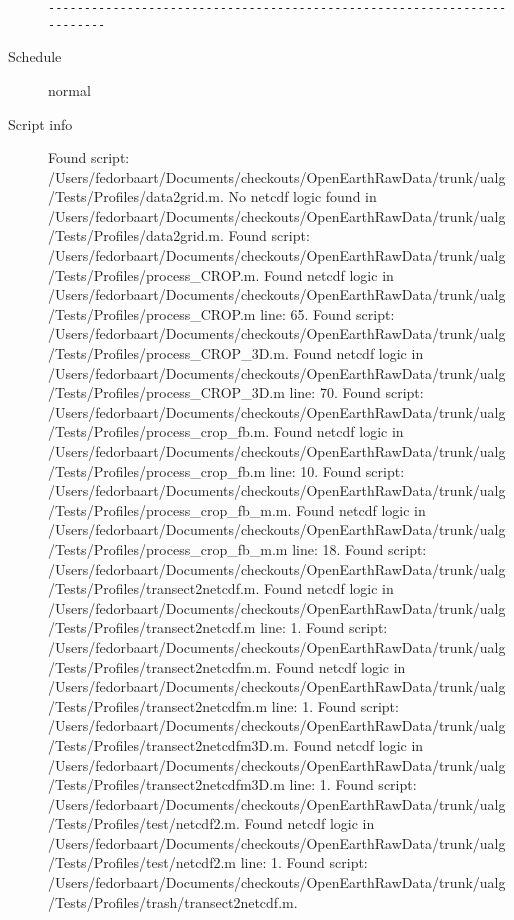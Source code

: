 \documentclass[9]{report}
\begin{document}
\begin{description}
\begin{verbatim}
------------------------------------------------------------------------

\end{verbatim}
  \item[Schedule] normal
  \item[Script info] Found script: /Users/fedorbaart/Documents/checkouts/OpenEarthRawData/trunk/ualg/Tests/Profiles/data2grid.m.
No netcdf logic found in /Users/fedorbaart/Documents/checkouts/OpenEarthRawData/trunk/ualg/Tests/Profiles/data2grid.m.
Found script: /Users/fedorbaart/Documents/checkouts/OpenEarthRawData/trunk/ualg/Tests/Profiles/process\_CROP.m.
Found netcdf logic in /Users/fedorbaart/Documents/checkouts/OpenEarthRawData/trunk/ualg/Tests/Profiles/process\_CROP.m line: 65.
Found script: /Users/fedorbaart/Documents/checkouts/OpenEarthRawData/trunk/ualg/Tests/Profiles/process\_CROP\_3D.m.
Found netcdf logic in /Users/fedorbaart/Documents/checkouts/OpenEarthRawData/trunk/ualg/Tests/Profiles/process\_CROP\_3D.m line: 70.
Found script: /Users/fedorbaart/Documents/checkouts/OpenEarthRawData/trunk/ualg/Tests/Profiles/process\_crop\_fb.m.
Found netcdf logic in /Users/fedorbaart/Documents/checkouts/OpenEarthRawData/trunk/ualg/Tests/Profiles/process\_crop\_fb.m line: 10.
Found script: /Users/fedorbaart/Documents/checkouts/OpenEarthRawData/trunk/ualg/Tests/Profiles/process\_crop\_fb\_m.m.
Found netcdf logic in /Users/fedorbaart/Documents/checkouts/OpenEarthRawData/trunk/ualg/Tests/Profiles/process\_crop\_fb\_m.m line: 18.
Found script: /Users/fedorbaart/Documents/checkouts/OpenEarthRawData/trunk/ualg/Tests/Profiles/transect2netcdf.m.
Found netcdf logic in /Users/fedorbaart/Documents/checkouts/OpenEarthRawData/trunk/ualg/Tests/Profiles/transect2netcdf.m line: 1.
Found script: /Users/fedorbaart/Documents/checkouts/OpenEarthRawData/trunk/ualg/Tests/Profiles/transect2netcdfm.m.
Found netcdf logic in /Users/fedorbaart/Documents/checkouts/OpenEarthRawData/trunk/ualg/Tests/Profiles/transect2netcdfm.m line: 1.
Found script: /Users/fedorbaart/Documents/checkouts/OpenEarthRawData/trunk/ualg/Tests/Profiles/transect2netcdfm3D.m.
Found netcdf logic in /Users/fedorbaart/Documents/checkouts/OpenEarthRawData/trunk/ualg/Tests/Profiles/transect2netcdfm3D.m line: 1.
Found script: /Users/fedorbaart/Documents/checkouts/OpenEarthRawData/trunk/ualg/Tests/Profiles/test/netcdf2.m.
Found netcdf logic in /Users/fedorbaart/Documents/checkouts/OpenEarthRawData/trunk/ualg/Tests/Profiles/test/netcdf2.m line: 1.
Found script: /Users/fedorbaart/Documents/checkouts/OpenEarthRawData/trunk/ualg/Tests/Profiles/trash/transect2netcdf.m.

\end{description}
\end{document}
